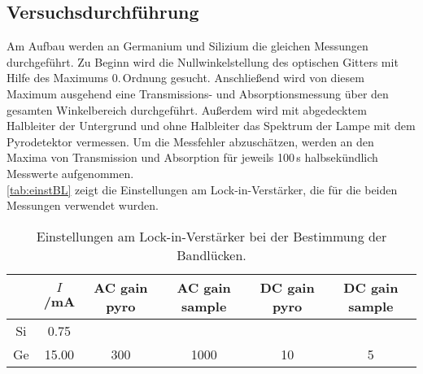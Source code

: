 \subsection{Versuchsdurchführung}

Am Aufbau werden an Germanium und Silizium die gleichen Messungen durchgeführt.
Zu Beginn wird die Nullwinkelstellung des optischen Gitters mit Hilfe des Maximums 0.\,Ordnung gesucht.
Anschließend wird von diesem Maximum ausgehend eine Trans\-missions- und Absorptionsmessung
über den gesamten Winkelbereich durchgeführt.
Außerdem wird mit abgedecktem Halbleiter der Untergrund und ohne Halbleiter das Spektrum der Lampe
mit dem Pyrodetektor vermessen.
Um die Messfehler abzuschätzen, werden an den Maxima von Transmission und Absorption für jeweils 100\,s
halbsekündlich Messwerte aufgenommen.\\
\autoref{tab:einstBL} zeigt die Einstellungen am Lock-in-Verstärker, die für die beiden Messungen verwendet wurden.


\begin{table}[H]
\caption{Einstellungen am Lock-in-Verstärker bei der Bestimmung der Bandlücken.}
\begin{center}
\begin{tabular}{|c|c|c|c|c|c|}
\hline
			&	$I$/mA	&	AC gain pyro	&	AC gain sample	&	DC gain pyro	&	DC gain sample	\\ \hline
Si			&	0.75	&					&					&					&					\\ \hline
Ge			&	15.00	&	300				&	1000			&10					&	5				\\ \hline
\end{tabular}
\end{center}
\label{tab:einstBL}
\end{table}
